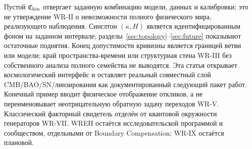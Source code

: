 {Пустой $\mathfrak C_{\rm kin}$ отвергает заданную комбинацию модели, данных и калибровки; это не утверждение WR-II о невозможности полного физического мира, реализующего наблюдения. Синглтон $(\kappa,H)$ является идентифицированным фоном на заданном интервале; разделы~\ref{sec:topology}--\ref{sec:future} показывают остаточные поднятия. Конец допустимости кривизны является границей ветви или модели; край пространства-времени или структурная стена WR-III без собственного анализа полного семейства не выводятся.}
{Эта статья открывает космологический интерфейс и оставляет реальный совместный слой CMB/BAO/SN/линзирования как документированный следующий пакет работ. Конечный пример вводит физическое отображение откликов, а не переименовывает неотрицательную обратную задачу переходов WR-V. Классический факторный свидетель отделён от квантовой окружности генераторов WR-VII. WREH остаётся исследовательской программой и сообществом, отдельными от Boundary Compensation; WR-IX остаётся плановой.}

